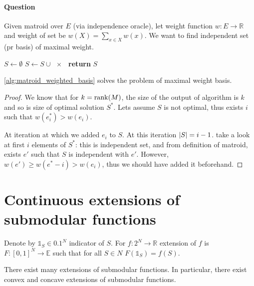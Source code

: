 \paragraph{Question} Given matroid over $E$ (via independence oracle), let weight function $w: E\to \mathbb{R}$ and weight of set be $w(X) = \sum_{x\in X} w(x)$. We want to find independent set (pr basis) of maximal weight.


\begin{algorithm}
	\caption{}\label{alg:matroid_weighted_basis}
	\begin{algorithmic}[1]
		\State $S \gets \emptyset$
		\State $S\gets S\cup \qty{x}$
		\EndIf
		\EndFor
		\State \textbf{return} $S$
		\EndProcedure
	\end{algorithmic}
\end{algorithm}
\begin{prop}
	\vref{alg:matroid_weighted_basis} solves the problem of maximal weight basis.
	\begin{proof}
		We know that for $k = \rank(M)$, the size of the output of algorithm is $k$ and so is size of optimal solution $S^*$.
		Lets assume $S$ is not optimal, thus exists $i$ such that $w(e_i^*) > w(e_i)$.
		
		At iteration at which we added $e_i$ to $S$. At this iteration $\abs{S}=i-1$. take a look at first $i$ elements of $S^*$: this is independent set, and from definition of matroid, exists $e'$ such that $S$ is independent with $e'$. However, $w(e') \geqslant w(e^*-i) > w(e_i)$, thus we should have added it beforehand.
	\end{proof}
\end{prop}

\section{Continuous extensions of submodular functions} 
\begin{definition}
	Denote by $\mathds{1}_S \in \qty{0,1}^N$ indicator of $S$. For $f: 2^N \to \mathbb{R}$ extension of $f$ is $F: [0,1]^N \to \mathbb{E}$ such that for all $S\in N$ $F(\mathds{1}_S) = f(S)$.
\end{definition}

There exist many extensions of submodular functions. In particular, there exist convex and concave extensions of submodular functions. 